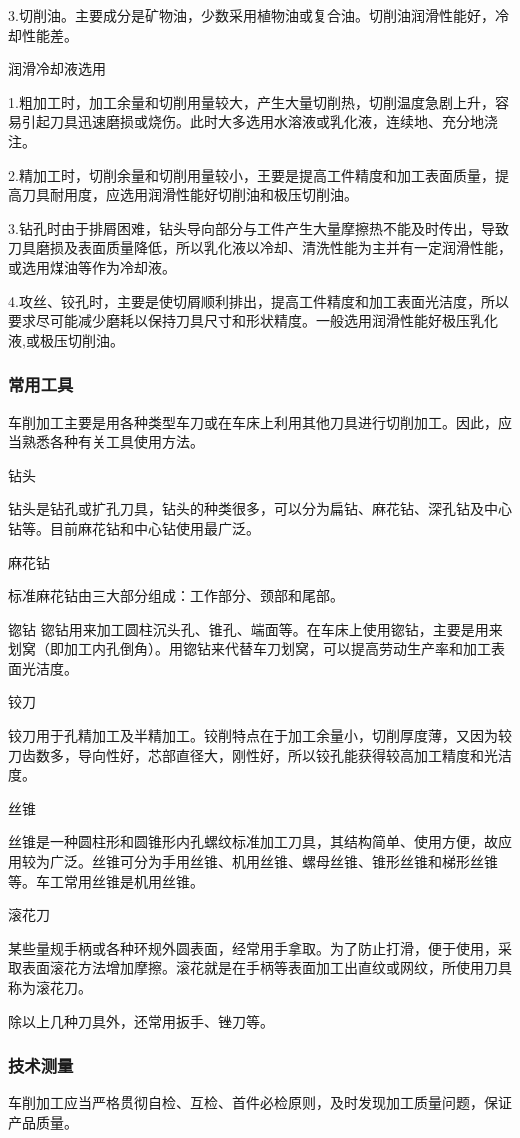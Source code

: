 \documentclass{ctexbook}
\begin{document}
3.切削油。主要成分是矿物油，少数采用植物油或复合油。切削油润滑性能好，冷却性能差。

润滑冷却液选用

1.粗加工时，加工余量和切削用量较大，产生大量切削热，切削温度急剧上升，容易引起刀具迅速磨损或烧伤。此时大多选用水溶液或乳化液，连续地、充分地浇注。

2.精加工时，切削余量和切削用量较小，王要是提高工件精度和加工表面质量，提高刀具耐用度，应选用润滑性能好切削油和极压切削油。

3.钻孔时由于排屑困难，钻头导向部分与工件产生大量摩擦热不能及时传出，导致刀具磨损及表面质量降低，所以乳化液以冷却、清洗性能为主并有一定润滑性能，或选用煤油等作为冷却液。

4.攻丝、铰孔时，主要是使切屑顺利排出，提高工件精度和加工表面光洁度，所以要求尽可能减少磨耗以保持刀具尺寸和形状精度。一般选用润滑性能好极压乳化液,或极压切削油。
\subsubsection{常用工具}
车削加工主要是用各种类型车刀或在车床上利用其他刀具进行切削加工。因此，应当熟悉各种有关工具使用方法。

钻头

钻头是钻孔或扩孔刀具，钻头的种类很多，可以分为扁钻、麻花钻、深孔钻及中心钻等。目前麻花钻和中心钻使用最广泛。

麻花钻

标准麻花钻由三大部分组成：工作部分、颈部和尾部。

锪钻 锪钻用来加工圆柱沉头孔、锥孔、端面等。在车床上使用锪钻，主要是用来划窝（即加工内孔倒角）。用锪钻来代替车刀划窝，可以提高劳动生产率和加工表面光洁度。

铰刀

铰刀用于孔精加工及半精加工。铰削特点在于加工余量小，切削厚度薄，又因为较刀齿数多，导向性好，芯部直径大，刚性好，所以铰孔能获得较高加工精度和光洁度。

丝锥

丝锥是一种圆柱形和圆锥形内孔螺纹标准加工刀具，其结构简单、使用方便，故应用较为广泛。丝锥可分为手用丝锥、机用丝锥、螺母丝锥、锥形丝锥和梯形丝锥等。车工常用丝锥是机用丝锥。

滚花刀

某些量规手柄或各种环规外圆表面，经常用手拿取。为了防止打滑，便于使用，采取表面滚花方法增加摩擦。滚花就是在手柄等表面加工出直纹或网纹，所使用刀具称为滚花刀。

除以上几种刀具外，还常用扳手、锉刀等。
\subsubsection{技术测量}
车削加工应当严格贯彻自检、互检、首件必检原则，及时发现加工质量问题，保证产品质量。
\end{document}

